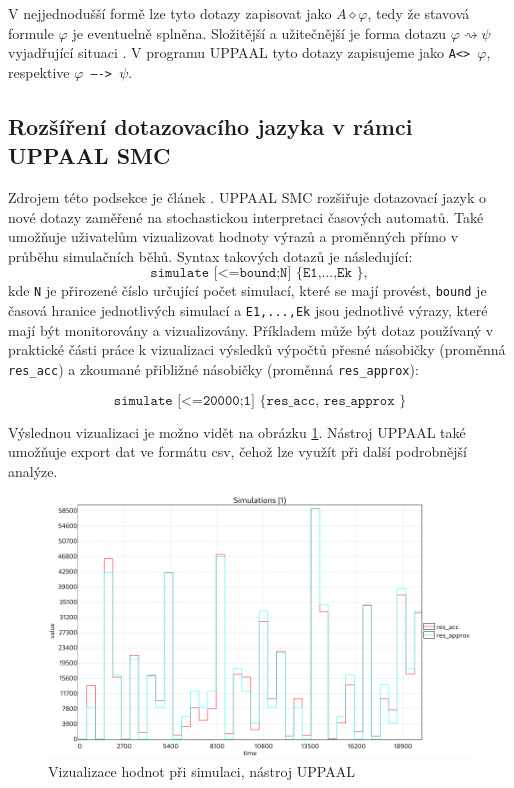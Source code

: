V nejjednodušší formě lze tyto dotazy zapisovat jako $A \diamond \varphi$, tedy že stavová formule $\varphi$ je eventuelně splněna. Složitější a užitečnější je forma dotazu $\varphi \rightsquigarrow \psi$ vyjadřující situaci . V programu UPPAAL tyto dotazy zapisujeme jako \texttt{A<> $\varphi$}, respektive \texttt{$\varphi$ ----> $\psi$}.

\subsection{Rozšíření dotazovacího jazyka v rámci UPPAAL SMC} \label{uppaal_smc_queries}
Zdrojem této podsekce je článek \cite{uppaal_smc}. UPPAAL SMC rozšiřuje dotazovací jazyk o nové dotazy zaměřené na stochastickou interpretaci časových automatů. Také umožňuje uživatelům vizualizovat hodnoty výrazů a proměnných přímo v průběhu simulačních běhů. Syntax takových dotazů je následující:
\begin{equation*}
    \texttt{simulate [<=bound;N] \{ E1,...,Ek \}},
\end{equation*}
kde \texttt{N} je přirozené číslo určující počet simulací, které se mají provést, \texttt{bound} je časová hranice jednotlivých simulací a \texttt{E1,...,Ek} jsou jednotlivé výrazy, které mají být monitorovány a vizualizovány. Příkladem může být dotaz používaný v praktické části práce k vizualizaci výsledků výpočtů přesné násobičky (proměnná \texttt{res\_acc}) a zkoumané přibližné násobičky (proměnná \texttt{res\_approx}):

\begin{equation*}
    \texttt{simulate [<=20000;1] \{ res\_acc, res\_approx \}}
\end{equation*}

Výslednou vizualizaci je možno vidět na obrázku \ref{fig:simulate_example}. Nástroj UPPAAL také umožňuje export dat ve formátu csv, čehož lze využít při další podrobnější analýze.

\begin{figure}[H]
    \centering
    \includegraphics[width=\textwidth]{obrazky-figures/simulate_example.png}
    \caption{Vizualizace hodnot při simulaci, nástroj UPPAAL}
    \label{fig:simulate_example}
\end{figure}

